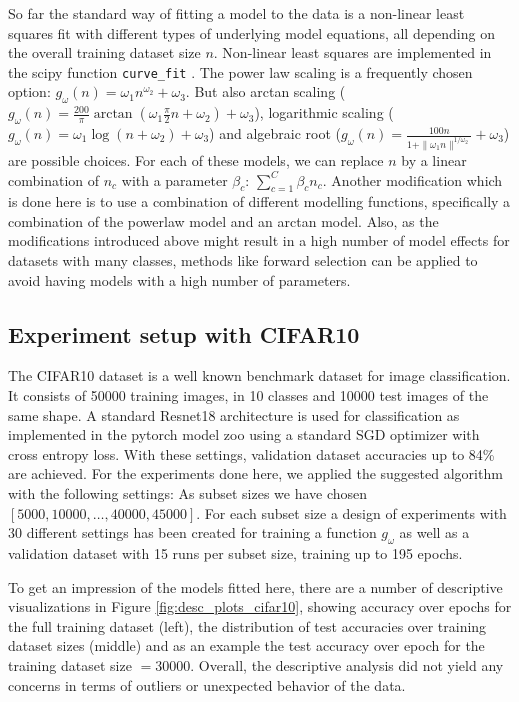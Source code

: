 \documentclass{article} %
\begin{document}
So far the standard way of fitting a model to the data is a non-linear least squares fit with different types of underlying model equations, all depending on the overall training dataset size $n$.
Non-linear least squares are implemented in the scipy function \verb|curve_fit| \cite{2020SciPy}.
The power law scaling \cite{mahmood2022data} is a frequently chosen option: $g_{\omega}(n) = \omega_1 n^{\omega_2} + \omega_3$.
But also arctan scaling ($g_{\omega}(n) = \frac{200}{\pi} \arctan(\omega_1 \frac{\pi}{2}n + \omega_2) + \omega_3$),
logarithmic scaling ($g_{\omega}(n) = \omega_1 \log(n + \omega_2) + \omega_3$) and
algebraic root ($g_{\omega}(n) = \frac{100n}{1 + \| \omega_1 n\|^{1/\omega_2}} + \omega_3$) are possible choices.
For each of these models, we can replace $n$ by a linear combination of $n_c$ with a parameter $\beta_c$: $\sum_{c = 1}^C \beta_c n_c$.
Another modification which is done here is to use a combination of different modelling functions, specifically a combination of the powerlaw model and an arctan model.
Also, as the modifications introduced above might result in a high number of model effects for datasets with many classes, methods like forward selection can be applied to avoid having models with a high number of parameters.

\subsection*{Experiment setup with CIFAR10}

The CIFAR10 dataset \cite{Cifar10} is a well known benchmark dataset for image classification.
It consists of 50000 training images, in 10 classes and 10000 test images of the same shape.
A standard Resnet18 architecture \cite{he2015resnet} is used for classification as implemented in the pytorch \cite{pytorch} model zoo using a standard SGD optimizer with cross entropy loss.
With these settings, validation dataset accuracies up to 84\% are achieved.
For the experiments done here, we applied the suggested algorithm with the following settings:
As subset sizes we have chosen $[5000, 10000, \dots, 40000, 45000]$. For each subset size a design of experiments with 30 different settings has been created for training a function $g_{\omega}$ as well as a validation dataset with 15 runs per subset size, training up to 195 epochs.

To get an impression of the models fitted here, there are a number of descriptive visualizations in Figure 
\ref{fig:desc_plots_cifar10}, showing accuracy over epochs for the full training dataset (left), the distribution of test accuracies over training dataset sizes (middle) and as an example 
the test accuracy over epoch for the training dataset size $= 30000$.
 Overall, the descriptive analysis did not yield any concerns in terms of outliers or unexpected behavior of the data.
\end{document}
